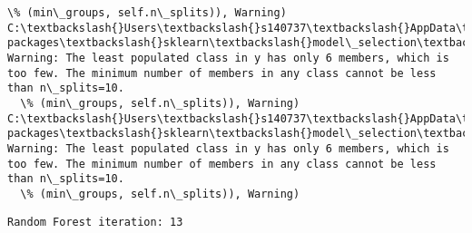 \documentclass[11pt]{article}
\begin{document}
\begin{Verbatim}[commandchars=\\\{\}]
  \% (min\_groups, self.n\_splits)), Warning)
C:\textbackslash{}Users\textbackslash{}s140737\textbackslash{}AppData\textbackslash{}Local\textbackslash{}Continuum\textbackslash{}anaconda3\textbackslash{}lib\textbackslash{}site-packages\textbackslash{}sklearn\textbackslash{}model\_selection\textbackslash{}\_split.py:605: Warning: The least populated class in y has only 6 members, which is too few. The minimum number of members in any class cannot be less than n\_splits=10.
  \% (min\_groups, self.n\_splits)), Warning)
C:\textbackslash{}Users\textbackslash{}s140737\textbackslash{}AppData\textbackslash{}Local\textbackslash{}Continuum\textbackslash{}anaconda3\textbackslash{}lib\textbackslash{}site-packages\textbackslash{}sklearn\textbackslash{}model\_selection\textbackslash{}\_split.py:605: Warning: The least populated class in y has only 6 members, which is too few. The minimum number of members in any class cannot be less than n\_splits=10.
  \% (min\_groups, self.n\_splits)), Warning)

    \end{Verbatim}

    \begin{Verbatim}[commandchars=\\\{\}]
Random Forest iteration: 13 

    \end{Verbatim}
\end{document}
